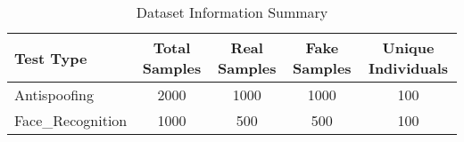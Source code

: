 \begin{table}[htbp]
\centering
\caption{Dataset Information Summary}
\label{tab:dataset_info}
\begin{tabular}{|l|c|c|c|c|}
\hline
\textbf{Test Type} & \textbf{Total Samples} & \textbf{Real Samples} & \textbf{Fake Samples} & \textbf{Unique Individuals} \\
\hline
Antispoofing & 2000 & 1000 & 1000 & 100 \\
\hline
Face_Recognition & 1000 & 500 & 500 & 100 \\
\hline
\end{tabular}
\end{table}